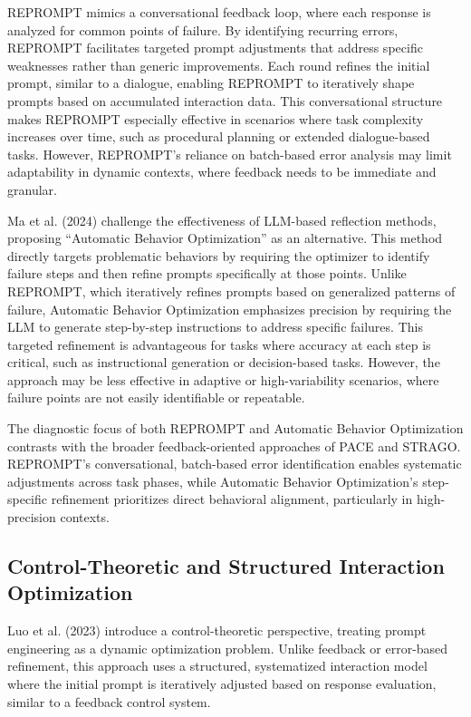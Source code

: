 \documentclass[runningheads]{llncs}
\begin{document}
REPROMPT mimics a conversational feedback loop, where each response is analyzed for common points of failure. By identifying recurring errors, REPROMPT facilitates targeted prompt adjustments that address specific weaknesses rather than generic improvements. Each round refines the initial prompt, similar to a dialogue, enabling REPROMPT to iteratively shape prompts based on accumulated interaction data. This conversational structure makes REPROMPT especially effective in scenarios where task complexity increases over time, such as procedural planning or extended dialogue-based tasks. However, REPROMPT’s reliance on batch-based error analysis may limit adaptability in dynamic contexts, where feedback needs to be immediate and granular.

Ma et al. (2024) \cite{ma2024largelanguagemodelsgood} challenge the effectiveness of LLM-based reflection methods, proposing “Automatic Behavior Optimization” as an alternative. This method directly targets problematic behaviors by requiring the optimizer to identify failure steps and then refine prompts specifically at those points. Unlike REPROMPT, which iteratively refines prompts based on generalized patterns of failure, Automatic Behavior Optimization emphasizes precision by requiring the LLM to generate step-by-step instructions to address specific failures. This targeted refinement is advantageous for tasks where accuracy at each step is critical, such as instructional generation or decision-based tasks. However, the approach may be less effective in adaptive or high-variability scenarios, where failure points are not easily identifiable or repeatable.

The diagnostic focus of both REPROMPT and Automatic Behavior Optimization contrasts with the broader feedback-oriented approaches of PACE and STRAGO. REPROMPT’s conversational, batch-based error identification enables systematic adjustments across task phases, while Automatic Behavior Optimization’s step-specific refinement prioritizes direct behavioral alignment, particularly in high-precision contexts.

\subsection{Control-Theoretic and Structured Interaction Optimization}

Luo et al. (2023) \cite{luo2023promptengineeringlensoptimal} introduce a control-theoretic perspective, treating prompt engineering as a dynamic optimization problem. Unlike feedback or error-based refinement, this approach uses a structured, systematized interaction model where the initial prompt is iteratively adjusted based on response evaluation, similar to a feedback control system.
\end{document}
